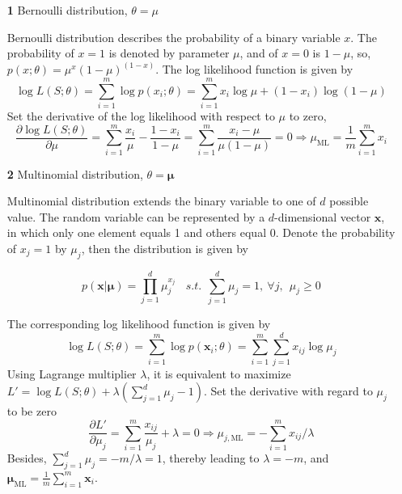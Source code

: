\documentclass{article}
\begin{document}
	\begin{itemize}
	\item [\textbf{1}] Bernoulli distribution, $\theta={\mu}$
	
	Bernoulli distribution describes the probability of a binary variable $x$. The probability of $x=1$ is denoted by parameter $\mu$, and of $x=0$ is $1-\mu$, so, $p(x;\theta)=\mu^x(1-\mu)^{(1-x)}$. The log likelihood function is given by
	\begin{equation*}
	\log L(S;\theta) = \sum_{i=1}^m \log p(x_i;\theta) = \sum_{i=1}^m x_i\log \mu + (1-x_i)\log(1-\mu)
	\end{equation*}
Set the derivative of the log likelihood with respect to $\mu$ to zero,
	\begin{equation*}
	\frac{\partial \log L(S;\theta)}{\partial \mu} = \sum_{i=1}^m \frac{x_i}{\mu} - \frac{1-x_i}{1-\mu} = \sum_{i=1}^m \frac{x_i-\mu}{\mu(1-\mu)} = 0 \Longrightarrow	 \mu_{\mathrm{ML}}=\frac{1}{m}\sum_{i=1}^m x_i	
	\end{equation*}
	
	\item [\textbf{2}] Multinomial distribution, $\theta=\bm{\mu}$
	
	Multinomial distribution extends the binary variable to one of $d$ possible value. The random variable can be represented by a $d$-dimensional vector $\bm{x}$, in which only one element equals 1 and others equal 0. Denote the probability of $x_j=1$ by $\mu_j$, then the distribution is given by
	
	\begin{equation*}
	p(\bm{x}|\bm{\mu}) = \prod_{j=1}^d \mu_j^{x_j}\ \ \ \ \mathit{s.t.}\ \ \sum_{j=1}^d \mu_j=1,\ \forall j,\ \ \mu_j\geq 0
	\end{equation*}

	The corresponding log likelihood function is given by
	\begin{equation*}
	\log L(S;\theta) = \sum_{i=1}^m \log p(\bm{x}_i;\theta) = \sum_{i=1}^m \sum_{j=1}^d x_{ij} \log \mu_j
	\end{equation*}
Using Lagrange multiplier $\lambda$, it is equivalent to maximize  $L' = \log L(S;\theta) + \lambda \left( \sum_{j=1}^d \mu_j - 1 \right) $. Set the derivative with regard to  $\mu_j$ to be zero
	\begin{equation*}
	\frac{\partial L'}{\partial \mu_j} = \sum_{i=1}^m\frac{x_{ij}}{\mu_j} + \lambda = 0  \Longrightarrow	 \mu_{j,\mathrm{ML}} = -\sum_{i=1}^m x_{ij}/\lambda
	\end{equation*}
Besides, $\sum_{j=1}^d \mu_j=-m/\lambda=1$, thereby leading to $\lambda=-m$, and $\bm{\mu}_{\mathrm{ML}} = \frac{1}{m}\sum_{i=1}^m \bm{x}_i$.
	

\end{itemize}
\end{document}
